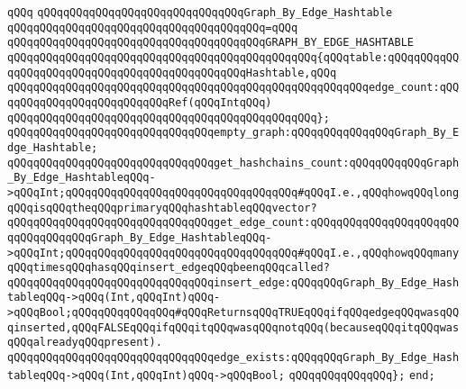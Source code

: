 \verb|qQQq|\newline
\verb|qQQqqQQqqQQqqQQqqQQqqQQqqQQqqQQqGraph_By_Edge_Hashtable|\newline
\verb|qQQqqQQqqQQqqQQqqQQqqQQqqQQqqQQqqQQqqQQq=qQQq|\newline
\verb|qQQqqQQqqQQqqQQqqQQqqQQqqQQqqQQqqQQqqQQqGRAPH_BY_EDGE_HASHTABLE|\newline
\verb|qQQqqQQqqQQqqQQqqQQqqQQqqQQqqQQqqQQqqQQqqQQqqQQq{qQQqtable:qQQqqQQqqQQqqQQqqQQqqQQqqQQqqQQqqQQqqQQqqQQqqQQqHashtable,qQQq|\newline
\verb|qQQqqQQqqQQqqQQqqQQqqQQqqQQqqQQqqQQqqQQqqQQqqQQqqQQqqQQqedge_count:qQQqqQQqqQQqqQQqqQQqqQQqqQQqRef(qQQqIntqQQq)|\newline
\verb|qQQqqQQqqQQqqQQqqQQqqQQqqQQqqQQqqQQqqQQqqQQqqQQq};|\newline
\newline
\verb|qQQqqQQqqQQqqQQqqQQqqQQqqQQqqQQqempty_graph:qQQqqQQqqQQqqQQqGraph_By_Edge_Hashtable;|\newline
\newline
\verb|qQQqqQQqqQQqqQQqqQQqqQQqqQQqqQQqget_hashchains_count:qQQqqQQqqQQqGraph_By_Edge_HashtableqQQq->qQQqInt;qQQqqQQqqQQqqQQqqQQqqQQqqQQqqQQqqQQq#qQQqI.e.,qQQqhowqQQqlongqQQqisqQQqtheqQQqprimaryqQQqhashtableqQQqvector?|\newline
\verb|qQQqqQQqqQQqqQQqqQQqqQQqqQQqqQQqget_edge_count:qQQqqQQqqQQqqQQqqQQqqQQqqQQqqQQqqQQqGraph_By_Edge_HashtableqQQq->qQQqInt;qQQqqQQqqQQqqQQqqQQqqQQqqQQqqQQqqQQq#qQQqI.e.,qQQqhowqQQqmanyqQQqtimesqQQqhasqQQqinsert_edgeqQQqbeenqQQqcalled?|\newline
\newline
\verb|qQQqqQQqqQQqqQQqqQQqqQQqqQQqqQQqinsert_edge:qQQqqQQqGraph_By_Edge_HashtableqQQq->qQQq(Int,qQQqInt)qQQq->qQQqBool;qQQqqQQqqQQqqQQq#qQQqReturnsqQQqTRUEqQQqifqQQqedgeqQQqwasqQQqinserted,qQQqFALSEqQQqifqQQqitqQQqwasqQQqnotqQQq(becauseqQQqitqQQqwasqQQqalreadyqQQqpresent).|\newline
\verb|qQQqqQQqqQQqqQQqqQQqqQQqqQQqqQQqedge_exists:qQQqqQQqGraph_By_Edge_HashtableqQQq->qQQq(Int,qQQqInt)qQQq->qQQqBool;|\newline
\verb|qQQqqQQqqQQqqQQq};|\newline
\verb|end;|\newline

